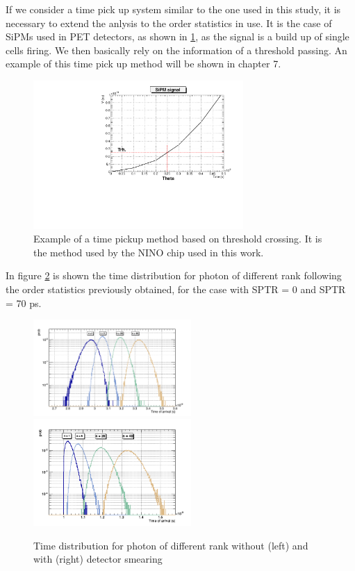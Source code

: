 If we consider a time pick up system similar to the one used in this study, it is necessary to extend the anlysis to the order statistics in use. 
It is the case of SiPMs used in PET detectors, as shown in \ref{fig:crossing}, as the signal is a build up of single cells firing. We then basically rely on the information of a threshold passing. An example of this time pick up method will be shown in chapter 7.
\begin{figure}[htbp]
\begin{center}
\includegraphics[width=8cm]{../Pictures/Chapter_4/crossing.pdf}
\end{center}
\caption[Threshold crossing example]{Example of a time pickup method based on threshold crossing. It is the method used by the NINO chip used in this work.}
\label{fig:crossing}
\end{figure}
In figure \ref{fig:rank} is shown the time distribution for photon of different rank following the order statistics previously obtained, for the case with SPTR = 0 and SPTR = 70 ps.
\begin{figure}[htbp]
\begin{center}
\includegraphics[width=6cm]{../Pictures/Chapter_4/photon_rank.png}
\includegraphics[width=6cm]{../Pictures/Chapter_4/photon_rank_no_smear.png}
\end{center}
\caption[Photon rank RMS]{Time distribution for photon of different rank without (left) and with (right) detector smearing}
\label{fig:rank}
\end{figure}
